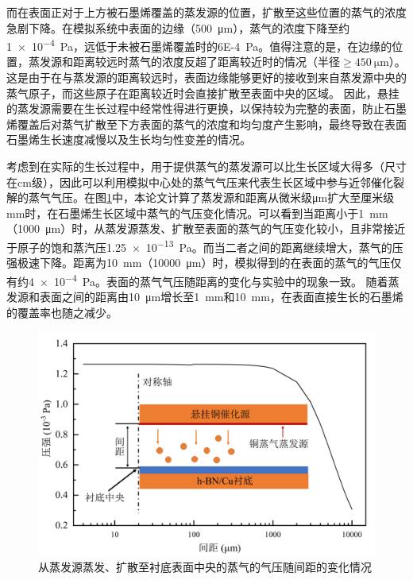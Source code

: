     而在表面正对于上方被石墨烯覆盖的蒸发源的位置，扩散至这些位置的蒸气的浓度急剧下降。在模拟系统中表面的边缘（\SI{500}{\micro\meter}），蒸气的浓度下降至约\SI{1e-4}{\pascal}，远低于未被石墨烯覆盖时的\SI{6E-4}{\pascal}。值得注意的是，在边缘的位置，蒸发源和距离较远时蒸气的浓度反超了距离较近时的情况（半径$\geqslant \SI{450}{\micro\meter}$）。这是由于在与蒸发源的距离较远时，表面边缘能够更好的接收到来自蒸发源中央的蒸气原子，而这些原子在距离较近时会直接扩散至表面中央的区域。
    因此，悬挂的蒸发源需要在生长过程中经常性得进行更换，以保持较为完整的表面，防止石墨烯覆盖后对蒸气扩散至下方表面的蒸气的浓度和均匀度产生影响，最终导致在表面石墨烯生长速度减慢以及生长均匀性变差的情况。

    考虑到在实际的生长过程中，用于提供蒸气的蒸发源可以比生长区域大得多（尺寸在\si{\centi\meter}级），因此可以利用模拟中心处的蒸气气压来代表生长区域中参与近邻催化裂解的蒸气气压。在图\ref{fig:CG_FEM_fullCuCenterVariousDistance}中，本论文计算了蒸发源和距离从微米级\si{\micro\meter}扩大至厘米级\si{\milli\meter}时，在石墨烯生长区域中蒸气的气压变化情况。可以看到当距离小于\SI{1}{\milli\meter}（\SI{1000}{\micro\meter}）时，从蒸发源蒸发、扩散至表面的蒸气的气压变化较小，且非常接近于原子的饱和蒸汽压\SI{1.25e-13}{\pascal}。而当二者之间的距离继续增大，蒸气的压强极速下降。距离为\SI{10}{\milli\meter}（\SI{10000}{\micro\meter}）时，模拟得到的在表面的蒸气的气压仅有约\SI{4e-4}{\pascal}。表面的蒸气气压随距离的变化与实验中的现象一致。
    随着蒸发源和表面之间的距离由\SI{10}{\micro\meter}增长至\SI{1}{\milli\meter}和\SI{10}{\milli\meter}，在表面直接生长的石墨烯的覆盖率也随之减少。

    \begin{figure}[htb]
        \includegraphics{pic/CG_FEM_fullCuCenterVariousDistance.png}
        \caption{从蒸发源蒸发、扩散至衬底表面中央的蒸气的气压随间距的变化情况}
        \label{fig:CG_FEM_fullCuCenterVariousDistance}
    \end{figure}


